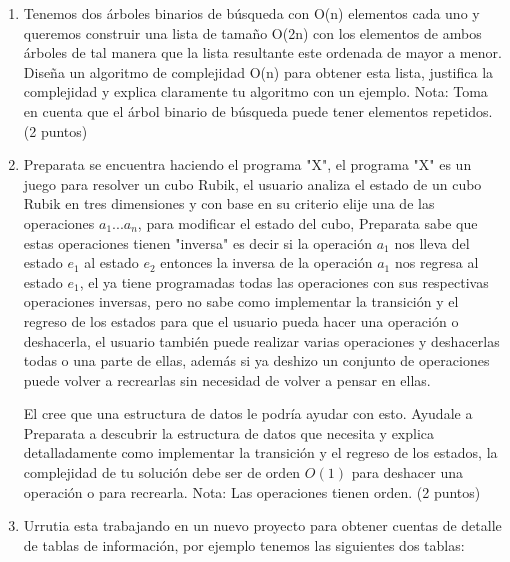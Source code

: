 \documentclass{article}
\begin{document}
\begin{enumerate}
\begin{enumerate}
\end{enumerate}

\item Tenemos dos árboles binarios de búsqueda con O(n) elementos cada uno y queremos construir una lista de tamaño O(2n)  con los elementos de ambos árboles de tal manera que la lista resultante este ordenada de mayor a menor. Diseña un algoritmo de complejidad O(n) para obtener esta lista, justifica la complejidad y explica claramente tu algoritmo con un ejemplo. Nota: Toma en cuenta que el árbol binario de búsqueda puede tener elementos repetidos. (2 puntos)

\item Preparata se encuentra haciendo el programa "X", el programa "X" es un juego para resolver un cubo Rubik, el usuario analiza el estado de  un cubo Rubik en tres dimensiones y con base en su criterio  elije una de las operaciones $a_1 ... a_n$, para modificar el estado del cubo, Preparata sabe que estas operaciones tienen "inversa" es decir si la operación $a_1$ nos lleva del estado $e_1$ al estado $e_2$ entonces la inversa de la operación $a_1$ nos regresa al estado $e_1$, el ya tiene programadas todas las operaciones con sus respectivas operaciones inversas, pero no sabe como implementar la transición y el regreso de los estados para que el usuario pueda hacer una operación o deshacerla, el usuario también puede realizar varias operaciones y deshacerlas todas o una parte de ellas, además si ya deshizo un conjunto de operaciones puede volver a recrearlas sin necesidad de volver a pensar en ellas.
    
El cree que una estructura de datos le podría ayudar con esto. Ayudale a Preparata a descubrir la estructura de datos que necesita y explica detalladamente como  implementar la transición y el regreso de los estados, la complejidad de tu solución debe ser de orden $O(1)$ para deshacer una operación o para recrearla. Nota: Las operaciones tienen orden. (2 puntos)

\item Urrutia esta trabajando en un nuevo proyecto para obtener cuentas de detalle de tablas de información, por ejemplo tenemos las siguientes dos tablas:

\begin{figure}[H]
    \centering
    \shadowsize=0.8pt
    \fboxrule=0pt
    \fboxsep=0pt
    \color{lightgray}
    \color{black}
    \label{fig:12}
\end{figure}
    

\end{enumerate}
\end{document}
